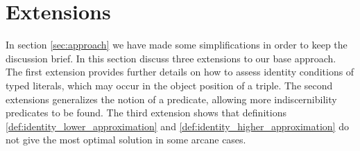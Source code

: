 \section{Extensions}
\label{sec:extensions}

In section \ref{sec:approach} 
  we have made some simplifications in order to keep the discussion brief.
In this section discuss three extensions to our base approach.
The first extension provides further details on how to assess
  identity conditions of typed literals, which may occur in the object
  position of a triple.
The second extensions generalizes the notion of a
predicate, allowing more indiscernibility predicates to be found.
The third extension shows that definitions
  \ref{def:identity_lower_approximation} and
  \ref{def:identity_higher_approximation}
  do not give the most optimal solution in some arcane cases.




